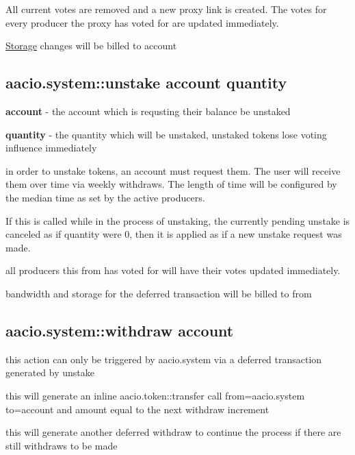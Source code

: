 All current votes are removed and a new proxy link is created. The votes for every producer the proxy has voted for are updated immediately.

\mbox{\hyperlink{struct_storage}{Storage}} changes will be billed to \textquotesingle{}account\textquotesingle{}

\subsection*{aacio.\+system\+::unstake account quantity}


\begin{DoxyItemize}
\item {\bfseries account} -\/ the account which is requsting their balance be unstaked
\item {\bfseries quantity} -\/ the quantity which will be unstaked, unstaked tokens lose voting influence immediately
\item in order to unstake tokens, an account must request them. The user will receive them over time via weekly withdraws. The length of time will be configured by the median time as set by the active producers.
\item If this is called while in the process of unstaking, the currently pending unstake is canceled as if quantity were 0, then it is applied as if a new unstake request was made.
\item all producers this \textquotesingle{}from\textquotesingle{} has voted for will have their votes updated immediately.
\item bandwidth and storage for the deferred transaction will be billed to \textquotesingle{}from\textquotesingle{}
\end{DoxyItemize}

\subsection*{aacio.\+system\+::withdraw account}


\begin{DoxyItemize}
\item this action can only be triggered by aacio.\+system via a deferred transaction generated by unstake
\item this will generate an inline aacio.\+token\+::transfer call from=aacio.\+system to=account and amount equal to the next withdraw increment
\item this will generate another deferred withdraw to continue the process if there are still withdraws to be made
\end{DoxyItemize}

